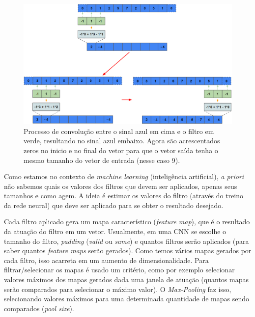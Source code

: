 \documentclass[a4paper,12pt,oneside]{book}
\begin{document}
\begin{figure}[H]
    \centering
    \includegraphics[scale = 0.38]{figs/conv_same.png}
    \caption{Processo de convolução entre o sinal azul em cima e o filtro em verde, resultando no sinal azul embaixo. Agora são acrescentados zeros no inicio e no final do vetor para que o vetor saída tenha o mesmo tamanho do vetor de entrada (nesse caso 9).}
    \label{fig:conv_same}
\end{figure}
\par Como estamos no contexto de \textit{machine learning} (inteligência artificial), \textit{a priori} não sabemos quais os valores dos filtros que devem ser aplicados, apenas seus tamanhos e como agem. A ideia é estimar os valores do filtro (através do treino da rede neural) que deve ser aplicado para se obter o resultado desejado.

\par Cada filtro aplicado gera um mapa característico (\textit{feature map}), que é o resultado da atuação do filtro em um vetor. Usualmente, em uma CNN se escolhe o tamanho do filtro, \textit{padding} (\textit{valid} ou \textit{same}) e quantos filtros serão aplicados (para saber quantos \textit{feature maps} serão gerados). Como temos vários mapas gerados por cada filtro, isso acarreta em um aumento de dimensionalidade. Para filtrar/selecionar os mapas é usado um critério, como por exemplo selecionar valores máximos dos mapas gerados dada uma janela de atuação (quantos mapas serão comparados para selecionar o máximo valor). O \textit{Max-Pooling} faz isso, selecionando valores máximos para uma determinada quantidade de mapas sendo comparados (\textit{pool size}).

\end{document}
